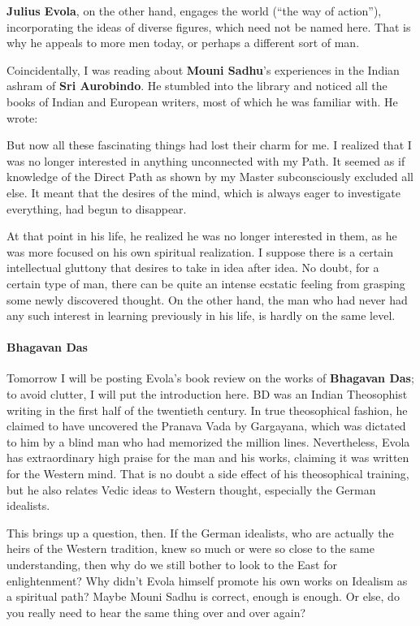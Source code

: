 \textbf{Julius Evola}, on the other hand, engages the world (``the way of action''), incorporating the ideas of diverse figures, which need not be named here. That is why he appeals to more men today, or perhaps a different sort of man.

Coincidentally, I was reading about \textbf{Mouni Sadhu}'s experiences in the Indian ashram of \textbf{Sri Aurobindo}. He stumbled into the library and noticed all the books of Indian and European writers, most of which he was familiar with. He wrote:

\begin{quotex}
But now all these fascinating things had lost their charm for me. I realized that I was no longer interested in anything unconnected with my Path. It seemed as if knowledge of the Direct Path as shown by my Master subconsciously excluded all else. It meant that the desires of the mind, which is always eager to investigate everything, had begun to disappear.
\end{quotex}


At that point in his life, he realized he was no longer interested in them, as he was more focused on his own spiritual realization. I suppose there is a certain intellectual gluttony that desires to take in idea after idea. No doubt, for a certain type of man, there can be quite an intense ecstatic feeling from grasping some newly discovered thought. On the other hand, the man who had never had any such interest in learning previously in his life, is hardly on the same level.

\paragraph{Bhagavan Das}


Tomorrow I will be posting Evola's book review on the works of \textbf{Bhagavan Das}; to avoid clutter, I will put the introduction here. BD was an Indian Theosophist writing in the first half of the twentieth century. In true theosophical fashion, he claimed to have uncovered the Pranava Vada by Gargayana, which was dictated to him by a blind man who had memorized the million lines. Nevertheless, Evola has extraordinary high praise for the man and his works, claiming it was written for the Western mind. That is no doubt a side effect of his theosophical training, but he also relates Vedic ideas to Western thought, especially the German idealists.

This brings up a question, then. If the German idealists, who are actually the heirs of the Western tradition, knew so much or were so close to the same understanding, then why do we still bother to look to the East for enlightenment? Why didn't Evola himself promote his own works on Idealism as a spiritual path? Maybe Mouni Sadhu is correct, enough is enough. Or else, do you really need to hear the same thing over and over again?



